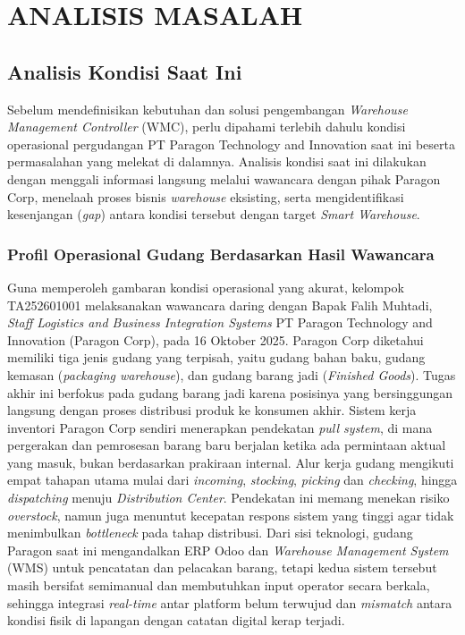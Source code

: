 \cleardoublepage %
\chapter{ANALISIS MASALAH}
\label{chap:analisis-masalah}

\section{Analisis Kondisi Saat Ini}
Sebelum mendefinisikan kebutuhan dan solusi pengembangan \textit{Warehouse Management Controller} (WMC), perlu dipahami terlebih dahulu kondisi operasional pergudangan PT Paragon Technology and Innovation saat ini beserta permasalahan yang melekat di dalamnya. Analisis kondisi saat ini dilakukan dengan menggali informasi langsung melalui wawancara dengan pihak Paragon Corp, menelaah proses bisnis \textit{warehouse} eksisting, serta mengidentifikasi kesenjangan (\textit{gap}) antara kondisi tersebut dengan target \textit{Smart Warehouse}.

\subsection{Profil Operasional Gudang Berdasarkan Hasil Wawancara}
Guna memperoleh gambaran kondisi operasional yang akurat, kelompok TA252601001 melaksanakan wawancara daring dengan Bapak Falih Muhtadi, \textit{Staff Logistics and Business Integration Systems} PT Paragon Technology and Innovation (Paragon Corp), pada 16 Oktober 2025. Paragon Corp diketahui memiliki tiga jenis gudang yang terpisah, yaitu gudang bahan baku, gudang kemasan (\textit{packaging warehouse}), dan gudang barang jadi (\textit{Finished Goods}). Tugas akhir ini berfokus pada gudang barang jadi karena posisinya yang bersinggungan langsung dengan proses distribusi produk ke konsumen akhir. Sistem kerja inventori Paragon Corp sendiri menerapkan pendekatan \textit{pull system}, di mana pergerakan dan pemrosesan barang baru berjalan ketika ada permintaan aktual yang masuk, bukan berdasarkan prakiraan internal. Alur kerja gudang mengikuti empat tahapan utama mulai dari \textit{incoming}, \textit{stocking}, \textit{picking} dan \textit{checking}, hingga \textit{dispatching} menuju \textit{Distribution Center}. Pendekatan ini memang menekan risiko \textit{overstock}, namun juga menuntut kecepatan respons sistem yang tinggi agar tidak menimbulkan \textit{bottleneck} pada tahap distribusi. Dari sisi teknologi, gudang Paragon saat ini mengandalkan ERP Odoo dan \textit{Warehouse Management System} (WMS) untuk pencatatan dan pelacakan barang, tetapi kedua sistem tersebut masih bersifat semimanual dan membutuhkan input operator secara berkala, sehingga integrasi \textit{real-time} antar platform belum terwujud dan \textit{mismatch} antara kondisi fisik di lapangan dengan catatan digital kerap terjadi.

